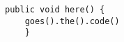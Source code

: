 \documentclass{report}
\begin{document}
\begin{lstlisting}[label=some-code,caption=Some Code]
public void here() {
	goes().the().code()
	}
	\end{lstlisting}

	
\end{document}
